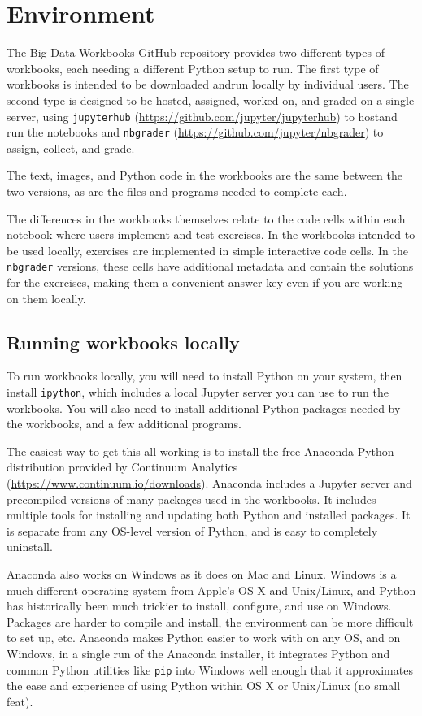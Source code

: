 \documentclass[]{krantz}
\begin{document}
\section{Environment}\label{environment}

The Big-Data-Workbooks GitHub repository provides two different types of
workbooks, each needing a different Python setup to run. The first type
of workbooks is intended to be downloaded andrun locally by individual
users. The second type is designed to be hosted, assigned, worked on,
and graded on a single server, using \texttt{jupyterhub}
(\url{https://github.com/jupyter/jupyterhub}) to hostand run the
notebooks and \texttt{nbgrader}
(\url{https://github.com/jupyter/nbgrader}) to assign, collect, and
grade.

The text, images, and Python code in the workbooks are the same between
the two versions, as are the files and programs needed to complete each.

The differences in the workbooks themselves relate to the code cells
within each notebook where users implement and test exercises. In the
workbooks intended to be used locally, exercises are implemented in
simple interactive code cells. In the \texttt{nbgrader} versions, these
cells have additional metadata and contain the solutions for the
exercises, making them a convenient answer key even if you are working
on them locally.

\subsection{Running workbooks locally}\label{running-workbooks-locally}

To run workbooks locally, you will need to install Python on your
system, then install \texttt{ipython}, which includes a local Jupyter
server you can use to run the workbooks. You will also need to install
additional Python packages needed by the workbooks, and a few additional
programs.

The easiest way to get this all working is to install the free Anaconda
Python distribution provided by Continuum Analytics
(\url{https://www.continuum.io/downloads}). Anaconda includes a Jupyter
server and precompiled versions of many packages used in the workbooks.
It includes multiple tools for installing and updating both Python and
installed packages. It is separate from any OS-level version of Python,
and is easy to completely uninstall.

Anaconda also works on Windows as it does on Mac and Linux. Windows is a
much different operating system from Apple's OS X and Unix/Linux, and
Python has historically been much trickier to install, configure, and
use on Windows. Packages are harder to compile and install, the
environment can be more difficult to set up, etc. Anaconda makes Python
easier to work with on any OS, and on Windows, in a single run of the
Anaconda installer, it integrates Python and common Python utilities
like \texttt{pip} into Windows well enough that it approximates the ease
and experience of using Python within OS X or Unix/Linux (no small
feat).
\end{document}
